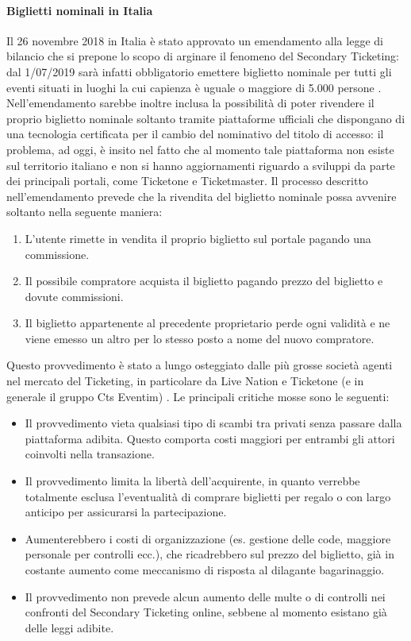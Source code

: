 \paragraph{Biglietti nominali in Italia}
Il 26 novembre 2018 in Italia è stato approvato un emendamento alla legge di bilancio che si prepone lo scopo di arginare il fenomeno del Secondary Ticketing: dal 1/07/2019 sarà infatti obbligatorio emettere biglietto nominale per tutti gli eventi situati in luoghi la cui capienza è uguale o maggiore di 5.000 persone \cite{larepbag}. Nell'emendamento sarebbe inoltre inclusa la possibilità di poter rivendere il proprio biglietto nominale soltanto tramite piattaforme ufficiali che dispongano di una tecnologia certificata per il cambio del nominativo del titolo di accesso: il problema, ad oggi, è insito nel fatto che al momento tale piattaforma non esiste sul territorio italiano e non si hanno aggiornamenti riguardo a sviluppi da parte dei principali portali, come Ticketone e Ticketmaster.
Il processo descritto nell'emendamento prevede che la rivendita del biglietto nominale possa avvenire soltanto nella seguente maniera: 
\begin{enumerate}
\item L'utente rimette in vendita il proprio biglietto sul portale pagando una commissione.
\item Il possibile compratore acquista il biglietto pagando prezzo del biglietto e dovute commissioni.
\item Il biglietto appartenente al precedente proprietario perde ogni validità e ne viene emesso un altro per lo stesso posto a nome del nuovo compratore. 
\end{enumerate}   
Questo provvedimento è stato a lungo osteggiato dalle più grosse società agenti nel mercato del Ticketing, in particolare da Live Nation e Ticketone (e in generale il gruppo Cts Eventim) \cite{solebag}. Le principali critiche mosse sono le seguenti: 
\begin{itemize}
\item Il provvedimento vieta qualsiasi tipo di scambi tra privati senza passare dalla piattaforma adibita. Questo comporta costi maggiori per entrambi gli attori coinvolti nella transazione. 
\item Il provvedimento limita la libertà dell'acquirente, in quanto verrebbe totalmente esclusa l'eventualità di comprare biglietti per regalo o con largo anticipo per assicurarsi la partecipazione.
\item Aumenterebbero i costi di organizzazione (es. gestione delle code, maggiore personale per controlli ecc.), che ricadrebbero sul prezzo del biglietto, già in costante aumento come meccanismo di risposta al dilagante bagarinaggio. 
\item Il provvedimento non prevede alcun aumento delle multe o di controlli nei confronti del Secondary Ticketing online, sebbene al momento esistano già delle leggi adibite. 
\end{itemize}

